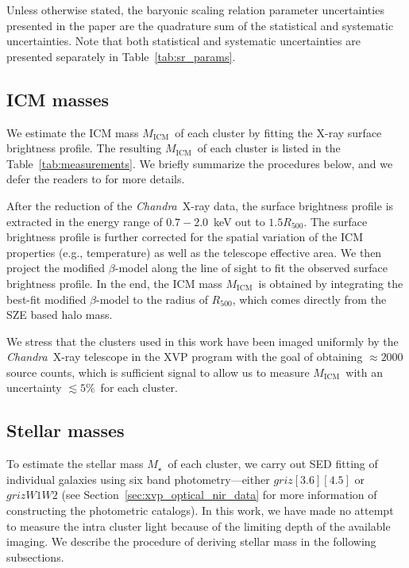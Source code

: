 \documentclass[useAMS,usenatbib,iop,numberedappendix]{mn2e}
\newcommand{\Rfiveoo}{\ensuremath{R_{500}}}
\newcommand{\CHANDRA}{\emph{Chandra}}
\newcommand{\Mstar}{\ensuremath{M_{\star}}}
\newcommand{\Mgas}{\ensuremath{M_{\mathrm{ICM}}}}
\newcommand{\IRACone}{\ensuremath{[3.6]}}
\newcommand{\IRACtwo}{\ensuremath{[4.5]}}
\newcommand{\Wone}{\ensuremath{W1}}
\newcommand{\Wtwo}{\ensuremath{W2}}
\newcommand{\percent}{\ensuremath{\%}}
\begin{document}
Unless otherwise stated, the baryonic scaling relation parameter uncertainties presented in the paper are the quadrature sum of the statistical and systematic uncertainties.  Note that both statistical and systematic uncertainties are presented separately in Table~\ref{tab:sr_params}.

\subsection{ICM masses}
\label{sec:icmmass}

We estimate the ICM mass \Mgas\ of each cluster by fitting the X-ray surface brightness profile. The resulting \Mgas\ of each cluster is listed in the Table~\ref{tab:measurements}. We briefly summarize the procedures below, and we defer the readers to \cite{mcdonald13} for more details.

After the reduction of the \CHANDRA\ X-ray data, the surface brightness profile is extracted in the energy range of $0.7-2.0$~keV out to $1.5\Rfiveoo$.  The surface brightness profile is further corrected for the spatial variation of the ICM properties (e.g., temperature) as well as the telescope effective area.  We then project the modified $\beta$-model \citep{vikhlinin06} along the line of sight to fit the observed surface brightness profile.  In the end, the ICM mass \Mgas\ is obtained by integrating the best-fit modified $\beta$-model to the radius of \Rfiveoo, which comes directly from the SZE based halo mass.

We stress that the clusters used in this work have been imaged uniformly by the \CHANDRA\ X-ray telescope in the XVP program with the goal of obtaining $\approx2000$ source counts, which is sufficient signal to allow us to measure \Mgas\ with an uncertainty $\lesssim5$\percent\ for each cluster.


\subsection{Stellar masses}
\label{sec:stellarmass}

To estimate the stellar mass \Mstar\ of each cluster, we carry out SED fitting of individual galaxies using six band photometry---either $griz\IRACone\IRACtwo$ or $griz\Wone\Wtwo$ (see Section~\ref{sec:xvp_optical_nir_data} for more information of constructing the photometric catalogs).
In this work, we have made no attempt to measure the intra cluster light because of the limiting depth of the available imaging.
We describe the procedure of deriving stellar mass in the following subsections.
\end{document}
